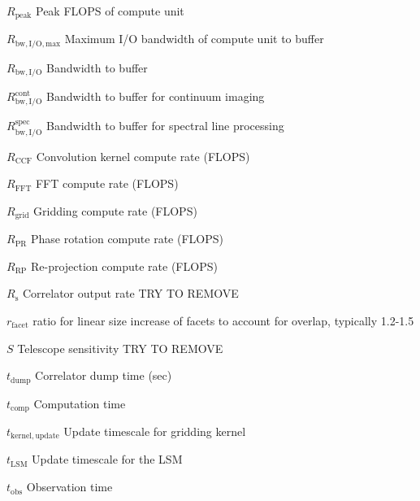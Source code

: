 \documentclass[11pt,a4paper]{article}
\newcommand{\facetoverlap}{r_\mathrm{facet}} %
\newcommand{\convkernflops}{R_\mathrm{CCF}} %
\newcommand{\fftflops}{R_\mathrm{FFT}} %
\newcommand{\griddingflops}{R_\mathrm{grid}} %
\newcommand{\phaserotflops}{R_\mathrm{PR}} %
\newcommand{\reprojflops}{R_\mathrm{RP}} %
\newcommand{\rcorr}{R_\mathrm{s}} %
\newcommand{\peakflop}{R_\mathrm{peak}} %
\newcommand{\maxiobwbuff}{R_\mathrm{bw,I/O,max}} %
\newcommand{\bwbuff}{R_\mathrm{bw,I/O}} %
\newcommand{\bwbuffcont}{R^\mathrm{cont}_\mathrm{bw,I/O}} %
\newcommand{\bwbuffspec}{R^\mathrm{spec}_\mathrm{bw,I/O}} %
\newcommand{\telsensit}{S} %
\newcommand{\corrdumpt}{t_\mathrm{dump}} %
\newcommand{\compt}{t_{\mathrm{comp}}} %
\newcommand{\gridkernupdate}{t_\mathrm{kernel,update}} %
\newcommand{\lsmupdate}{t_\mathrm{LSM}} %
\newcommand{\obst}{t_{\mathrm{obs}}} %
\begin{document}
\begin{basedescript}{\desclabelstyle{\pushlabel}\desclabelwidth{6em}}
\item[$\peakflop$] Peak FLOPS of compute unit \vspace{-0.2cm}
\item[$\maxiobwbuff$] Maximum I/O bandwidth of compute unit to buffer
  \vspace{-0.2cm}
\item[$\bwbuff$] Bandwidth to buffer \vspace{-0.2cm}
\item[$\bwbuffcont$] Bandwidth to buffer for continuum imaging\vspace{-0.2cm}
\item[$\bwbuffspec$] Bandwidth to buffer for spectral line processing\vspace{-0.2cm}
\item[$\convkernflops$] Convolution kernel compute rate (FLOPS)\vspace{-0.2cm}
\item[$\fftflops$] FFT compute rate (FLOPS)\vspace{-0.2cm}
\item[$\griddingflops$] Gridding compute rate (FLOPS)\vspace{-0.2cm}
\item[$\phaserotflops$] Phase rotation compute rate (FLOPS)\vspace{-0.2cm}
\item[$\reprojflops$] Re-projection compute rate (FLOPS)\vspace{-0.2cm}
\item[$\rcorr$] Correlator output rate\vspace{-0.2cm} TRY TO REMOVE
\item[$\facetoverlap$]  ratio for linear size increase of facets to account for overlap, typically 1.2-1.5 \vspace{-0.2cm}
\item[$\telsensit$] Telescope sensitivity \vspace{-0.2cm} TRY TO REMOVE
\item[$\corrdumpt$] Correlator dump time (sec) \vspace{-0.2cm}
\item[$\compt$] Computation time \vspace{-0.2cm}
\item[$\gridkernupdate$] Update timescale for gridding kernel \vspace{-0.2cm}
\item[$\lsmupdate$] Update timescale for the LSM \vspace{-0.2cm}
\item[$\obst$] Observation time \vspace{-0.2cm}

\end{basedescript}
\end{document}

